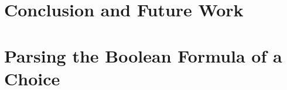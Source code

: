 \documentclass[double,10pt] {beavtex}
\begin{document}
\chapter{Conclusion and Future Work}
\label{sec:conc}


\pagebreak




\pagebreak

\appendix

\chapter{Parsing the Boolean Formula of a Choice}
\label{sec:ctx_parser}

\end{document}
